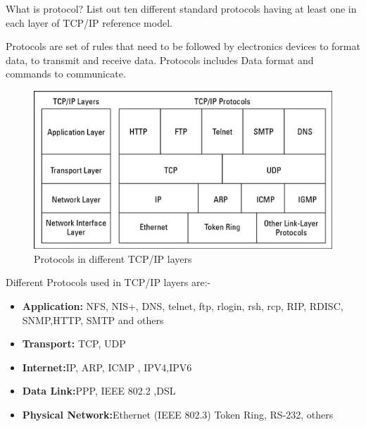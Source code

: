 \documentclass[a4paper,12pt]{article}
\begin{document}


\begin{Q}
    {
        What is protocol? List out ten different standard protocols having at least one in each layer of TCP/IP
        reference model.
    }
\end{Q}

\begin{A}
    {
Protocols are set of rules that need to be followed by electronics devices to format data, to transmit and receive data.
Protocols includes Data format and commands to communicate.\\

\begin{figure}[H]
    \centering
    \includegraphics[scale=0.7,cframe=blue 0.5pt 3pt]{Protocols in different layers.jpg}
    \caption{Protocols in different TCP/IP layers}
\end{figure}

Different Protocols used in TCP/IP layers are:- 
\begin{itemize}
    \item \textbf{Application:} NFS, NIS+, DNS, telnet, ftp, rlogin, rsh, rcp, RIP, RDISC, SNMP,HTTP, SMTP and others
    \item \textbf{Transport:} TCP, UDP 
    \item \textbf{Internet:}IP, ARP, ICMP , IPV4,IPV6
    \item \textbf{Data Link:}PPP, IEEE 802.2 ,DSL
    \item  \textbf{Physical Network:}Ethernet (IEEE 802.3) Token Ring, RS-232, others
\end{itemize}
    }
\end{A}   
\pagebreak
\end{document}
